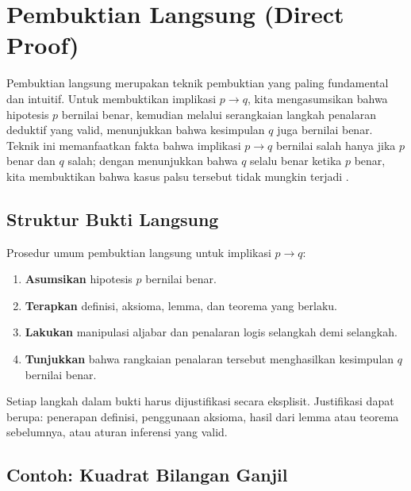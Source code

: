 \section{Pembuktian Langsung (Direct Proof)}

Pembuktian langsung merupakan teknik pembuktian yang paling fundamental dan intuitif. Untuk membuktikan implikasi $p \rightarrow q$, kita mengasumsikan bahwa hipotesis $p$ bernilai benar, kemudian melalui serangkaian langkah penalaran deduktif yang valid, menunjukkan bahwa kesimpulan $q$ juga bernilai benar. Teknik ini memanfaatkan fakta bahwa implikasi $p \rightarrow q$ bernilai salah hanya jika $p$ benar dan $q$ salah; dengan menunjukkan bahwa $q$ selalu benar ketika $p$ benar, kita membuktikan bahwa kasus palsu tersebut tidak mungkin terjadi \cite{rosen2019}.

\subsection{Struktur Bukti Langsung}

Prosedur umum pembuktian langsung untuk implikasi $p \rightarrow q$:

\begin{enumerate}
    \item \textbf{Asumsikan} hipotesis $p$ bernilai benar.
    \item \textbf{Terapkan} definisi, aksioma, lemma, dan teorema yang berlaku.
    \item \textbf{Lakukan} manipulasi aljabar dan penalaran logis selangkah demi selangkah.
    \item \textbf{Tunjukkan} bahwa rangkaian penalaran tersebut menghasilkan kesimpulan $q$ bernilai benar.
\end{enumerate}

Setiap langkah dalam bukti harus dijustifikasi secara eksplisit. Justifikasi dapat berupa: penerapan definisi, penggunaan aksioma, hasil dari lemma atau teorema sebelumnya, atau aturan inferensi yang valid.

\subsection{Contoh: Kuadrat Bilangan Ganjil}

